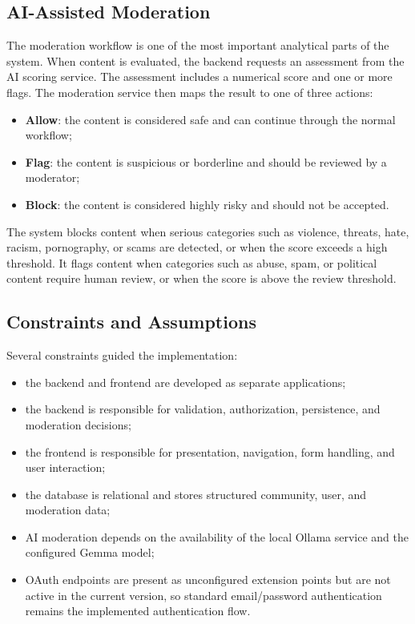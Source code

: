 \subsection{AI-Assisted Moderation}

The moderation workflow is one of the most important analytical parts of the system. When content is evaluated, the backend requests an assessment from the AI scoring service. The assessment includes a numerical score and one or more flags. The moderation service then maps the result to one of three actions:

\begin{itemize}
    \item \textbf{Allow}: the content is considered safe and can continue through the normal workflow;
    \item \textbf{Flag}: the content is suspicious or borderline and should be reviewed by a moderator;
    \item \textbf{Block}: the content is considered highly risky and should not be accepted.
\end{itemize}

The system blocks content when serious categories such as violence, threats, hate, racism, pornography, or scams are detected, or when the score exceeds a high threshold. It flags content when categories such as abuse, spam, or political content require human review, or when the score is above the review threshold.

\subsection{Constraints and Assumptions}

Several constraints guided the implementation:

\begin{itemize}
    \item the backend and frontend are developed as separate applications;
    \item the backend is responsible for validation, authorization, persistence, and moderation decisions;
    \item the frontend is responsible for presentation, navigation, form handling, and user interaction;
    \item the database is relational and stores structured community, user, and moderation data;
    \item AI moderation depends on the availability of the local Ollama service and the configured Gemma model;
    \item OAuth endpoints are present as unconfigured extension points but are not active in the current version, so standard email/password authentication remains the implemented authentication flow.
\end{itemize}

